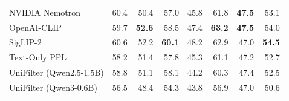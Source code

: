 \begin{table}[t]
\begin{tabular}{lrrrrrrr}
NVIDIA Nemotron & 60.4 & 50.4 & 57.0 & 45.8 & 61.8 & \textbf{47.5} & 53.1 \\
OpenAI-CLIP & 59.7 & \textbf{52.6} & 58.5 & 47.4 & \textbf{63.2} & \textbf{47.5} & 54.0 \\
SigLIP-2 & 60.6 & 52.2 & \textbf{60.1} & 48.2 & 62.9 & 47.0 & \textbf{54.5} \\
Text-Only PPL & 58.2 & 51.4 & 57.8 & 45.3 & 61.1 & 47.2 & 52.7 \\
UniFilter (Qwen2.5-1.5B) & 58.8 & 51.1 & 58.1 & 44.2 & 60.3 & 47.4 & 52.5 \\
UniFilter (Qwen3-0.6B) & 56.5 & 48.4 & 54.3 & 43.8 & 56.9 & 47.0 & 50.6 \\
\bottomrule
\end{tabular}
\end{table}
